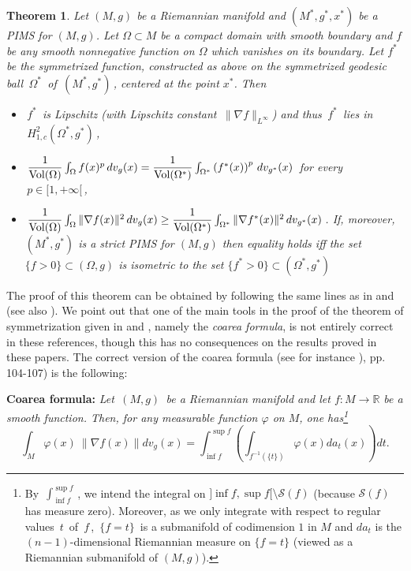 \documentclass[11pt, reqno]{amsart}
\newtheorem{theoreme}{Theorem}[section]
\theoremstyle{plain}
\begin{document}
\begin{theoreme}\label{symetrisation}
Let $(M,g)$ be a Riemannian manifold and  $(M^*,g^*, x^*)$ be a PIMS
for $(M,g)$. Let  $\Omega\subset M$ be  a compact domain with smooth boundary and 
$f$ be any smooth nonnegative function on  $\Omega$ which vanishes on its boundary.
 Let $f^*$ be the symmetrized function, constructed as above on the symmetrized geodesic ball $\,\Omega^* \,$ of  $\,(M^*,g^*)\,$, centered at the point
 $x^*$. Then
\begin{itemize}
\item[(i)] $\,f^*\,$ is Lipschitz (with Lipschitz constant $\,\|\nabla f\|_{L^\infty}$) and thus $\,f^*\,$ 
lies in $\, H_{1,c}^2\left( \Omega^* , g^*\right)\,$,
\item[(ii)] $\,\dfrac{1}{{\rm Vol} (\Omega)} 
\int_\Omega f(x)^p  \,dv_g (x) = \dfrac{1}{{\rm Vol} (\Omega^*)} 
\int_{\Omega^*} \left(f^* (x) \right)^p \, dv_{g^*} (x)\,$  for every $\,p \in [ 1 , +\infty [\,$,
\item[(iii)] $\, \dfrac{1}{{\rm Vol} (\Omega)}  \int_\Omega \|\nabla f (x)\|^2 \,dv_g (x) \ge
\dfrac{1}{{\rm Vol} (\Omega^*)} \int_{\Omega^*} \|\nabla f^* (x)\|^2 \,dv_{g^*} (x) \,$. If, moreover, $(M^*,g^*)$ is a strict PIMS for $(M,g)$ then equality holds iff the set $\{f>0\} \subset (\Omega, g)$ is isometric to the set $\{f^*>0\} \subset (\Omega^*, g^*)$
\end{itemize}
\end{theoreme}
The proof of this theorem can be obtained by following the same lines as in \cite{Ber} and \cite{Ga2} (see also \cite{bandle}).
We point out that one of the main tools in the proof of the theorem of symmetrization given in  \cite{Ber} and \cite{Ga2}, namely the {\em coarea formula}, is not entirely correct in these references, though this has no consequences on the results proved in these papers.  The  correct version of the coarea formula (see for instance \cite{B-Z}), pp. 104-107) is the following:

\vskip 0.3cm

\noindent
{\bf Coarea formula:} 
{\em Let $\,(M,g)\,$ be a Riemannian manifold 
and let $f : M \to \mathbb R$ be a smooth function.
Then, for any measurable function $\varphi$ on $M$, one has\footnote {By $\, \int_{\inf f}^{\sup f} \,$, we intend the integral 
on $]\inf f ,\sup f [ \setminus  {\mathcal S}(f)$ (because ${\mathcal S}(f)$ has measure zero).
 Moreover, as we only integrate with 
respect to regular values $\,t\,$ of $\,f\,$, $\,\{ f = t\}\,$ is a submanifold of 
codimension $1$ in $M$ and $da_t $ is  the $(n-1)$-dimensional 
Riemannian measure on $\{ f = t\}$ (viewed as a Riemannian submanifold of $(M , g)$).}
\begin{equation}\label{coarea}
\int_M \varphi (x)\ \|\nabla f (x)\|  dv_g (x) = \int_{\inf f}^{\sup f} \left( \int_{f^{-1}(\{t\})} 
\varphi (x) da_t (x)\right) dt.
\end{equation}}
\end{document}

